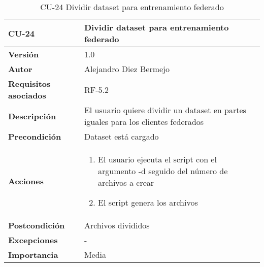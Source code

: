 \begin{table}[p]
	\centering
	\begin{tabularx}{\linewidth}{ p{} p{} }
		\toprule
		\textbf{CU-24}    & \textbf{Dividir dataset para entrenamiento federado}\\
		\toprule
		\textbf{Versión}              & 1.0    \\
		\textbf{Autor}                & Alejandro Diez Bermejo \\
		\textbf{Requisitos asociados} & RF-5.2 \\
		\textbf{Descripción}          & El usuario quiere dividir un dataset en partes iguales para los clientes federados \\
        \textbf{Precondición}         & Dataset está cargado \\
		\textbf{Acciones}             &
		\begin{enumerate}
			\def\labelenumi{\arabic{enumi}.}
			\tightlist
            \item El usuario ejecuta el script con el argumento -d seguido del número de archivos a crear
            \item El script genera los archivos
		\end{enumerate}\\
		\textbf{Postcondición}        & Archivos divididos \\
		\textbf{Excepciones}          & - \\
		\textbf{Importancia}          & Media \\
		\bottomrule
	\end{tabularx}
	\caption{CU-24 Dividir dataset para entrenamiento federado}
\end{table}

